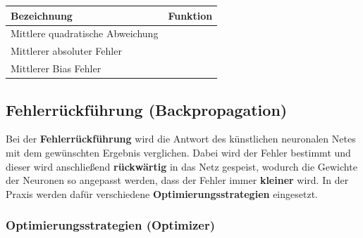 	\begin{center}
	\begin{tabular}[t]{|l|l|}
		\hline
		\textbf{Bezeichnung} & \textbf{Funktion} \\
		\hline
		Mittlere quadratische Abweichung  &  
		\addvbuffer[0.05cm]{
			$ \textrm{MSE} = \frac{\sum_{i=1}^{n} (y_i - \hat{y_i})^2}{n} $
		} \\
		\hline
		Mittlerer absoluter Fehler  &  
		\addvbuffer[0.05cm]{
			$ \textrm{MAE} = \frac{\sum_{i=1}^{n} |y_i - \hat{y_i}|}{n} $
		} \\
		\hline
		Mittlerer Bias Fehler  &  
		\addvbuffer[0.05cm]{
			$ \textrm{MBE} = \frac{\sum_{i=1}^{n} (y_i - \hat{y_i})}{n} $
		} \\
		\hline
		
	\end{tabular}
	\end{center}

\subsection{Fehlerrückführung (Backpropagation)}

	Bei der \textbf{Fehlerrückführung} wird die Antwort des künstlichen neuronalen Netes mit dem gewünschten Ergebnis verglichen. Dabei wird der Fehler bestimmt und dieser wird anschließend \textbf{rückwärtig} in das Netz gespeist, wodurch die Gewichte der Neuronen so angepasst werden, dass der Fehler immer \textbf{kleiner} wird. In der Praxis werden dafür verschiedene \textbf{Optimierungsstrategien} eingesetzt. \cite{rocketloop}
	
\subsubsection{Optimierungsstrategien (Optimizer)}


